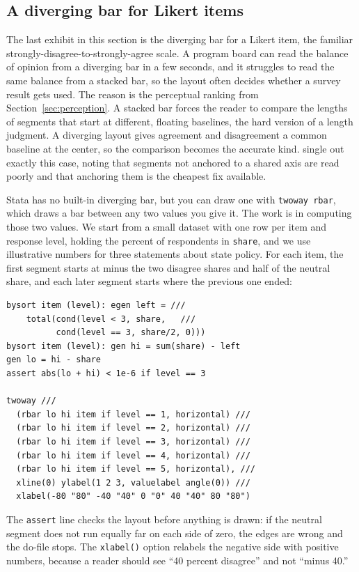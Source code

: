 \subsection{A diverging bar for Likert items}\label{sec:likert-div}
The last exhibit in this section is the diverging bar for a Likert item, the familiar strongly-disagree-to-strongly-agree scale. A program board can read the balance of opinion from a diverging bar in a few seconds, and it struggles to read the same balance from a stacked bar, so the layout often decides whether a survey result gets used. The reason is the perceptual ranking from Section~\ref{sec:perception}. A stacked bar forces the reader to compare the lengths of segments that start at different, floating baselines, the hard version of a length judgment. A diverging layout gives agreement and disagreement a common baseline at the center, so the comparison becomes the accurate kind. \textcite{franconeri2021science} single out exactly this case, noting that segments not anchored to a shared axis are read poorly and that anchoring them is the cheapest fix available.

Stata has no built-in diverging bar, but you can draw one with \texttt{twoway rbar}, which draws a bar between any two values you give it. The work is in computing those two values. We start from a small dataset with one row per item and response level, holding the percent of respondents in \texttt{share}, and we use illustrative numbers for three statements about state policy. For each item, the first segment starts at minus the two disagree shares and half of the neutral share, and each later segment starts where the previous one ended:
\par
{\footnotesize
\begin{verbatim}
bysort item (level): egen left = ///
    total(cond(level < 3, share,   ///
          cond(level == 3, share/2, 0)))
bysort item (level): gen hi = sum(share) - left
gen lo = hi - share
assert abs(lo + hi) < 1e-6 if level == 3

twoway ///
  (rbar lo hi item if level == 1, horizontal) ///
  (rbar lo hi item if level == 2, horizontal) ///
  (rbar lo hi item if level == 3, horizontal) ///
  (rbar lo hi item if level == 4, horizontal) ///
  (rbar lo hi item if level == 5, horizontal), ///
  xline(0) ylabel(1 2 3, valuelabel angle(0)) ///
  xlabel(-80 "80" -40 "40" 0 "0" 40 "40" 80 "80")
\end{verbatim}
}
The \texttt{assert} line checks the layout before anything is drawn: if the neutral segment does not run equally far on each side of zero, the edges are wrong and the do-file stops. The \texttt{xlabel()} option relabels the negative side with positive numbers, because a reader should see \enquote{40 percent disagree} and not \enquote{minus 40.}


